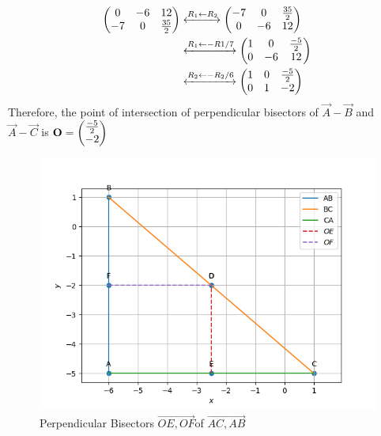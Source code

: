 \documentclass[11pt]{book}
\begin{document}
\begin{enumerate}[label=\thesection.\arabic*.,ref=\thesection.\theenumi]
\begin{align}
\begin{pmatrix}0 & -6& 12 \\ -7 & 0 & \frac{35}{2}\end{pmatrix} &\xleftrightarrow[]{R_1 \leftarrow R_2}
\begin{pmatrix}-7 & 0 & \frac{35}{2} \\ 0 & -6 & 12\end{pmatrix}\\
&\xleftrightarrow[]{R_1 \leftarrow -R1/7}
\begin{pmatrix}1 & 0 & \frac{-5}{2} \\ 0 & -6 & 12\end{pmatrix}\\ 
&\xleftrightarrow[]{R_2\leftarrow -R_2/6} \begin{pmatrix}1 & 0 & \frac{-5}{2} \\ 0 & 1 & -2\end{pmatrix}
\end{align}
Therefore, the point of intersection of perpendicular bisectors of $\vec{A}-\vec{B}$ and $\vec{A}-\vec{C}$ is $\mathbf{O} = \begin{pmatrix}\frac{-5}{2} \\ -2\end{pmatrix}$
		\begin{figure}[H]
\includegraphics[width=\columnwidth]{figs/OE_OF.png}
			\caption{Perpendicular Bisectors $\vec{OE,OF }$of $\vec{AC,AB}$}
\label{fig:Bisectors OE,OF}
\end{figure}


\end{enumerate}
\end{document}

